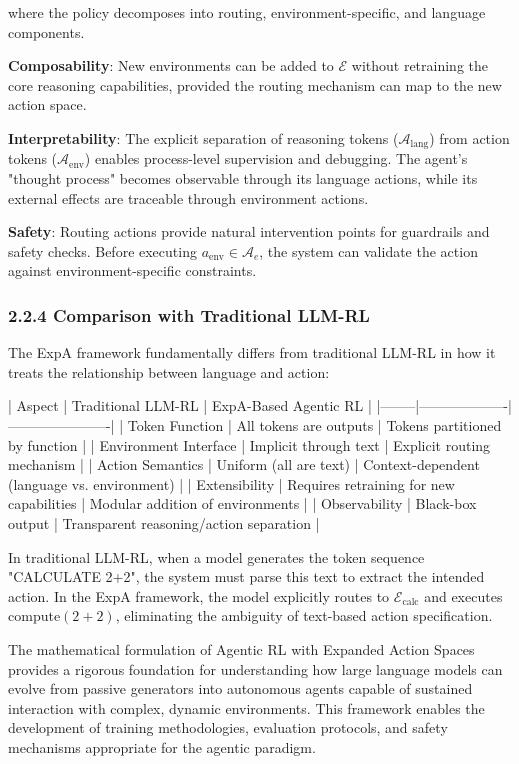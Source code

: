 where the policy decomposes into routing, environment-specific, and language components.

\textbf{Composability}: New environments can be added to $\mathcal{E}$ without retraining the core reasoning capabilities, provided the routing mechanism can map to the new action space.

\textbf{Interpretability}: The explicit separation of reasoning tokens ($\mathcal{A}_{\text{lang}}$) from action tokens ($\mathcal{A}_{\text{env}}$) enables process-level supervision and debugging. The agent's "thought process" becomes observable through its language actions, while its external effects are traceable through environment actions.

\textbf{Safety}: Routing actions provide natural intervention points for guardrails and safety checks. Before executing $a_{\text{env}} \in \mathcal{A}_e$, the system can validate the action against environment-specific constraints.

\subsubsection{2.2.4 Comparison with Traditional LLM-RL}

The ExpA framework fundamentally differs from traditional LLM-RL in how it treats the relationship between language and action:

| Aspect | Traditional LLM-RL | ExpA-Based Agentic RL |
|--------|-------------------|----------------------|
| Token Function | All tokens are outputs | Tokens partitioned by function |
| Environment Interface | Implicit through text | Explicit routing mechanism |
| Action Semantics | Uniform (all are text) | Context-dependent (language vs. environment) |
| Extensibility | Requires retraining for new capabilities | Modular addition of environments |
| Observability | Black-box output | Transparent reasoning/action separation |

In traditional LLM-RL, when a model generates the token sequence "CALCULATE 2+2", the system must parse this text to extract the intended action. In the ExpA framework, the model explicitly routes to $\mathcal{E}_{\text{calc}}$ and executes $\text{compute}(2+2)$, eliminating the ambiguity of text-based action specification.

The mathematical formulation of Agentic RL with Expanded Action Spaces provides a rigorous foundation for understanding how large language models can evolve from passive generators into autonomous agents capable of sustained interaction with complex, dynamic environments. This framework enables the development of training methodologies, evaluation protocols, and safety mechanisms appropriate for the agentic paradigm.
